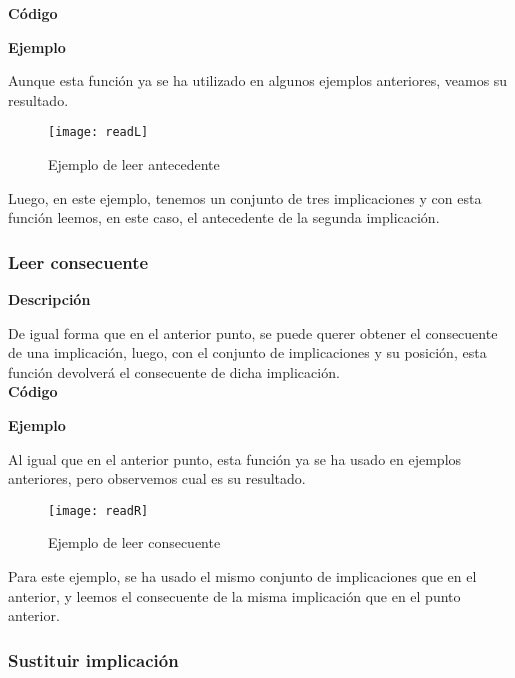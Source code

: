     \textbf{C\'odigo}

    
    \bigskip

    \textbf{Ejemplo}

    Aunque esta funci\'on ya se ha utilizado en algunos ejemplos anteriores, veamos su resultado.

    \begin{figure}[H]
        \centering
        \texttt{[image: readL]}
        \caption{Ejemplo de leer antecedente}
        \label{fig:readL}
    \end{figure}

    Luego, en este ejemplo, tenemos un conjunto de tres implicaciones y con esta funci\'on leemos, en este caso, el antecedente de 
    la segunda implicaci\'on. 



\subsubsection{Leer consecuente}

    \textbf{Descripci\'on}
    
    De igual forma que en el anterior punto, se puede querer obtener el consecuente de una implicaci\'on, luego, con el conjunto de 
    implicaciones y su posici\'on, esta funci\'on devolver\'a el consecuente de dicha implicaci\'on.
    \\


    \textbf{C\'odigo}

    
    \bigskip

    \textbf{Ejemplo}

    Al igual que en el anterior punto, esta funci\'on ya se ha usado en ejemplos anteriores, pero observemos cual es su resultado.

    \begin{figure}[H]
        \centering
        \texttt{[image: readR]}
        \caption{Ejemplo de leer consecuente}
        \label{fig:readR}
    \end{figure}

    Para este ejemplo, se ha usado el mismo conjunto de implicaciones que en el anterior, y leemos el consecuente de la misma 
    implicaci\'on que en el punto anterior.

    \clearpage

\subsubsection{Sustituir implicaci\'on}

